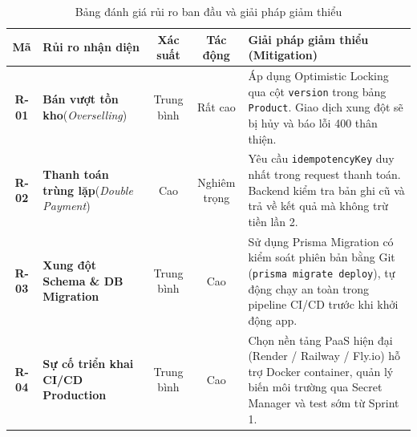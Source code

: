 \documentclass[12pt,a4paper]{article}
\begin{document}
\begin{table}[H]
\centering
\caption{Bảng đánh giá rủi ro ban đầu và giải pháp giảm thiểu}
\label{tab:risks}
\vspace{0.2cm}
\small
\renewcommand{\arraystretch}{1.3}
\begin{tabularx}{\textwidth}{|c|>{\raggedright\arraybackslash}p{3.5cm}|c|c|>{\raggedright\arraybackslash}X|}
\hline
\rowcolor{tableheader}
\textbf{Mã} & \textbf{Rủi ro nhận diện} & \textbf{Xác suất} & \textbf{Tác động} & \textbf{Giải pháp giảm thiểu (Mitigation)} \\
\hline
\textbf{R-01} & \textbf{Bán vượt tồn kho}\newline(\textit{Overselling}) & Trung bình & Rất cao & Áp dụng Optimistic Locking qua cột \texttt{version} trong bảng \texttt{Product}. Giao dịch xung đột sẽ bị hủy và báo lỗi 400 thân thiện. \\
\hline
\textbf{R-02} & \textbf{Thanh toán trùng lặp}\newline(\textit{Double Payment}) & Cao & Nghiêm trọng & Yêu cầu \texttt{idempotencyKey} duy nhất trong request thanh toán. Backend kiểm tra bản ghi cũ và trả về kết quả mà không trừ tiền lần 2. \\
\hline
\textbf{R-03} & \textbf{Xung đột Schema \& DB Migration} & Trung bình & Cao & Sử dụng Prisma Migration có kiểm soát phiên bản bằng Git (\texttt{prisma migrate deploy}), tự động chạy an toàn trong pipeline CI/CD trước khi khởi động app. \\
\hline
\textbf{R-04} & \textbf{Sự cố triển khai CI/CD Production} & Trung bình & Cao & Chọn nền tảng PaaS hiện đại (Render / Railway / Fly.io) hỗ trợ Docker container, quản lý biến môi trường qua Secret Manager và test sớm từ Sprint 1. \\
\hline
\end{tabularx}
\end{table}
\end{document}
